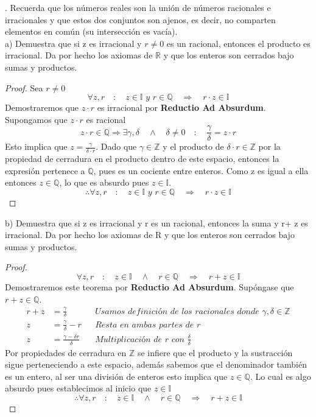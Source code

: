 \documentclass{article}
\begin{document}
.	Recuerda que los números reales son la unión de números racionales e irracionales y que estos dos conjuntos son ajenos, es decir, no comparten elementos en común (su intersección es vacía). \\
a) 	Demuestra que si z es irracional y  \(r \neq 0\) es un racional, entonces el producto es irracional. Da por hecho los axiomas de \(\mathbb{R}\) y que los enteros son cerrados bajo sumas y productos.\\
\begin{proof} Sea $r \neq 0$
\[ \forall z,r \quad : \quad z \in \mathbb{I} \textit{    y    } r \in \mathbb{Q} \quad \Rightarrow \quad r \cdot z \in \mathbb{I} \]
Demostraremos que $z \cdot r$ es irracional por \textbf{Reductio Ad Absurdum}.\\
Supongamos que $z \cdot r$ es racional
\[ z \cdot r \in \mathbb{Q} \Rightarrow \exists \gamma, \delta \quad \land \quad \delta \neq 0 \quad : \quad \frac{\gamma}{\delta} = z \cdot r \]
Esto implica que $z = \frac{\gamma}{\delta \cdot r}$. Dado que $\gamma \in \mathbb{Z}$ y el producto de $\delta \cdot r \in \mathbb{Z}$ por la propiedad de cerradura en el producto dentro de este espacio, entonces la expresión pertenece a $\mathbb{Q}$, pues es un cociente entre enteros. Como z es igual a ella entonces $ z \in \mathbb{Q}$, lo que es absurdo pues $z \in \mathbb{I}$.\\
\[ \therefore \forall z,r \quad : \quad z \in \mathbb{I} \textit{    y    } r \in \mathbb{Q} \quad \Rightarrow \quad r \cdot z \in \mathbb{I} \]
\end{proof}

b) Demuestra que si z es irracional y  r  es un racional, entonces la suma y  r+ z es irracional. Da por hecho los axiomas de R y que los enteros son cerrados bajo sumas y productos.
\begin{proof}
    \[ \forall z,r \quad : \quad z \in \mathbb{I} \quad \land \quad r \in \mathbb{Q} \quad \Rightarrow \quad r+z \in \mathbb{I}\]
    Demostraremos este teorema por \textbf{Reductio Ad Absurdum}. Supóngase que $r+z \in \mathbb{Q}$.\\
    \begin{align*}
        r + z &= \frac{\gamma}{\delta} && \textit{Usamos definición de los racionales donde  } \gamma,\delta \in \mathbb{Z} \\
        z &= \frac{\gamma}{\delta} - r && \textit{Resta en ambas partes de  } r \\
        z &= \frac{\gamma - \delta r}{\delta} && \textit{Multiplicación de r con  } \frac{\delta}{\delta}
    \end{align*}
    Por propiedades de cerradura en $\mathbb{Z}$ se infiere que el producto y la sustracción sigue perteneciendo a este espacio, además sabemos que el denominador también es un entero, al ser una división de enteros esto implica que $z \in \mathbb{Q}$. Lo cual es algo absurdo pues establecimos al inicio que $z \in \mathbb{I}$
    \[ \therefore \forall z,r \quad : \quad z \in \mathbb{I} \quad \land \quad r \in \mathbb{Q} \quad \Rightarrow \quad r+z \in \mathbb{I} \]
\end{proof}
\end{document}
